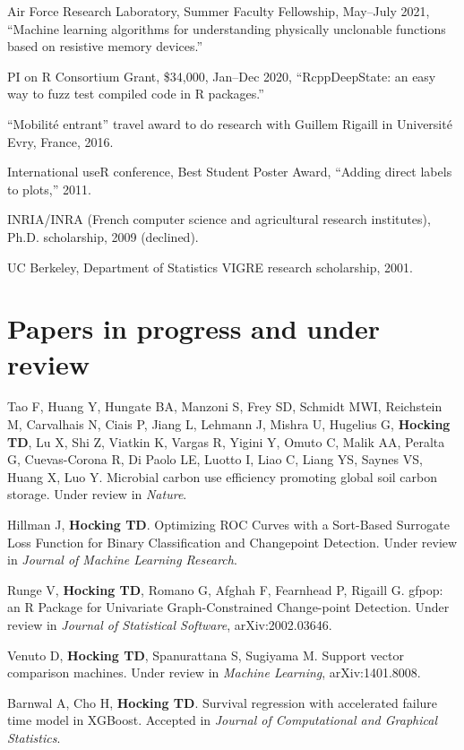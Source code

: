 \documentclass[margin,line]{res}
\begin{document}
\begin{resume}
Air Force Research Laboratory, Summer Faculty Fellowship, May--July
2021, ``Machine learning algorithms for understanding physically
unclonable functions based on resistive memory devices.''

PI on R Consortium Grant, \$34,000, Jan--Dec 2020, ``RcppDeepState: an easy
way to fuzz test compiled code in R packages.''

``Mobilit\'e entrant'' travel award to do research with Guillem Rigaill in
Universit\'e Evry, France, 2016.

International useR conference, Best Student Poster Award, ``Adding
direct labels to plots,'' 2011.

INRIA/INRA (French computer science and agricultural research institutes), Ph.D. scholarship, 2009 (declined).

UC Berkeley, Department of Statistics VIGRE research scholarship, 2001.


\section{\sc Papers in progress and under review}

Tao F, Huang Y, Hungate BA, Manzoni S, Frey SD, Schmidt MWI,
Reichstein M, Carvalhais N, Ciais P, Jiang L, Lehmann J, Mishra U,
Hugelius G, {\bf Hocking TD}, Lu X, Shi Z, Viatkin K, Vargas R, Yigini
Y, Omuto C, Malik AA, Peralta G, Cuevas-Corona R, Di Paolo LE, Luotto
I, Liao C, Liang YS, Saynes VS, Huang X, Luo Y. Microbial carbon use
efficiency promoting global soil carbon storage. Under review in {\it
  Nature}.

Hillman J, {\bf Hocking TD}. Optimizing ROC Curves with a Sort-Based
Surrogate Loss Function for Binary Classification and Changepoint
Detection. Under review in {\it Journal of Machine Learning Research}.

Runge V, {\bf Hocking TD}, Romano G, Afghah F, Fearnhead P, Rigaill
G. gfpop: an R Package for Univariate Graph-Constrained Change-point
Detection. Under review in {\it Journal of Statistical Software},
arXiv:2002.03646.

Venuto D, {\bf Hocking TD}, Spanurattana S, Sugiyama M. Support vector
comparison machines. Under review in {\it Machine Learning},
arXiv:1401.8008.

Barnwal A, Cho H, {\bf Hocking TD}. Survival regression with
accelerated failure time model in XGBoost. Accepted in {\it Journal of
  Computational and Graphical Statistics}.


\end{resume}
\end{document}
